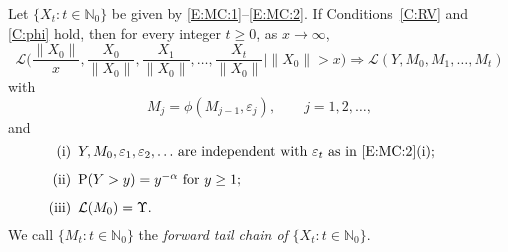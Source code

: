 \documentclass{aptpubarxiv}
\numberwithin{equation}{section}
\begin{document}
\begin{thm}
\label{T:forward}
Let $\{ X_t : t \in \mathbb{N}_0 \}$ be given by \eqref{E:MC:1}--\eqref{E:MC:2}. If Conditions~\ref{C:RV} and \ref{C:phi} hold, then for every integer $t \geq 0$, as $x \to \infty$,
\begin{equation}
\label{E:forward:1}
	{\mathcal{L}} \biggl( \frac{\|X_0\|}{x}, \frac{X_0}{\|X_0\|}, \frac{X_1}{\|X_0\|}, \ldots, \frac{X_t}{\|X_0\|} \bigg| \|X_0\| > x \biggr)
	\Rightarrow {\mathcal{L}}(Y, M_0, M_1, \ldots, M_t)
\end{equation}
with 
\begin{equation}
\label{E:Mj}
	M_j =  \phi(M_{j-1},{\varepsilon}_j), \qquad j = 1, 2, \ldots,
\end{equation}
and
\begin{equation}
\label{E:forward:2}
\mbox{\begin{minipage}[h]{0.90\textwidth}
\begin{itemize}
\item[(i)] $Y, M_0, {\varepsilon}_1, {\varepsilon}_2, \ldots$ are independent with ${\varepsilon}_t$ as in \eqref{E:MC:2}(i);
\item[(ii)] ${\mathrm{P}}(Y > y) = y^{-\alpha}$ for $y \geq 1$;
\item[(iii)] $\mathcal{L}(M_0)=\Upsilon$.
\end{itemize}
\end{minipage}}
\end{equation}
We call $\{M_t: t \in \mathbb{N}_0\}$ the \emph{forward tail chain of} $\{X_t: t \in \mathbb{N}_0\}$.
\end{thm}
\end{document}
